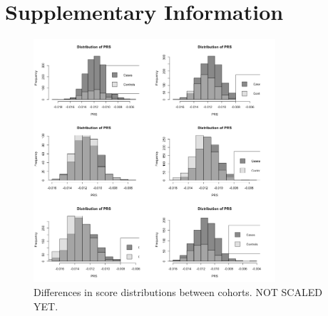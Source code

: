 \chapter{Supplementary Information}

\begin{figure}[h]
\caption{Differences in score distributions between cohorts. NOT SCALED YET.}
\centering
\includegraphics[width=0.8\textwidth]{Figures/scoredif_trs.png}
\end{figure}